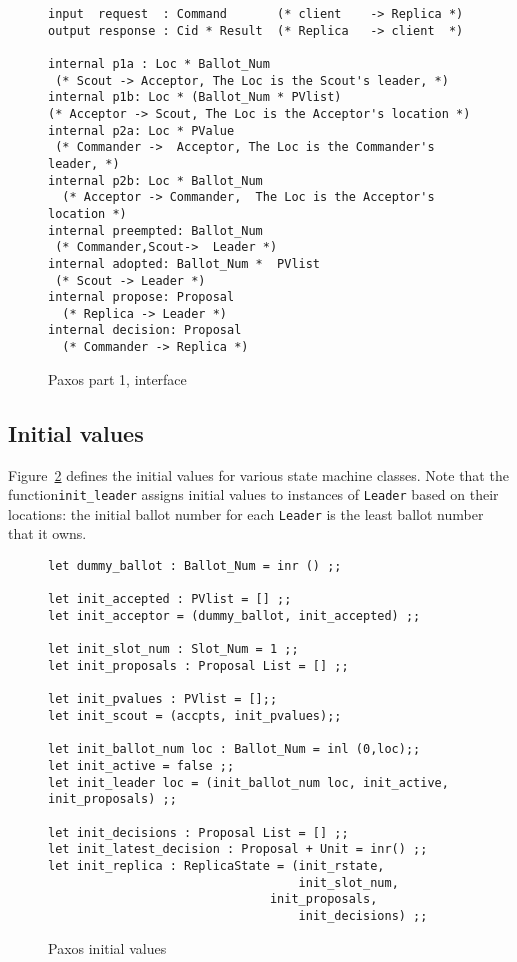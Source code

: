 \documentclass[final]{article}
\begin{document}
\begin{figure}%
  \begin{lstlisting}[basicstyle=\small]
input  request  : Command       (* client    -> Replica *)
output response : Cid * Result  (* Replica   -> client  *)

internal p1a : Loc * Ballot_Num
 (* Scout -> Acceptor, The Loc is the Scout's leader, *)
internal p1b: Loc * (Ballot_Num * PVlist)
(* Acceptor -> Scout, The Loc is the Acceptor's location *)
internal p2a: Loc * PValue
 (* Commander ->  Acceptor, The Loc is the Commander's leader, *)
internal p2b: Loc * Ballot_Num
  (* Acceptor -> Commander,  The Loc is the Acceptor's location *)
internal preempted: Ballot_Num
 (* Commander,Scout->  Leader *)
internal adopted: Ballot_Num *  PVlist
 (* Scout -> Leader *)
internal propose: Proposal
  (* Replica -> Leader *)
internal decision: Proposal
  (* Commander -> Replica *)
  \end{lstlisting}
  \caption{Paxos part 1, interface}
  \label{fig:Paxos-interface}
\end{figure}

\subsection{Initial values}

Figure~\ref{fig:Paxos-initial-values} defines the initial values for
various state machine classes.  Note that the
function\lstinline{init_leader} assigns initial values to instances of
\lstinline{Leader} based on their locations: the initial ballot number
for each \lstinline{Leader} is the least ballot number that it owns.

\begin{figure}%
  \begin{lstlisting}[basicstyle=\small]
let dummy_ballot : Ballot_Num = inr () ;;

let init_accepted : PVlist = [] ;;
let init_acceptor = (dummy_ballot, init_accepted) ;;

let init_slot_num : Slot_Num = 1 ;;
let init_proposals : Proposal List = [] ;;

let init_pvalues : PVlist = [];;
let init_scout = (accpts, init_pvalues);;

let init_ballot_num loc : Ballot_Num = inl (0,loc);;
let init_active = false ;;
let init_leader loc = (init_ballot_num loc, init_active, init_proposals) ;;

let init_decisions : Proposal List = [] ;;
let init_latest_decision : Proposal + Unit = inr() ;;
let init_replica : ReplicaState = (init_rstate,
                                   init_slot_num,
      	       	   	           init_proposals,
                                   init_decisions) ;;
  \end{lstlisting}
  \caption{Paxos initial values}
  \label{fig:Paxos-initial-values}
\end{figure}
\end{document}

